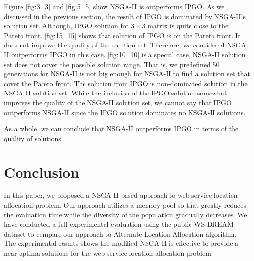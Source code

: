 \documentclass{llncs}
\begin{document}
Figure \ref{fig:3_3} and \ref{fig:5_5} show NSGA-II is outperforms IPGO. As we discussed in the previous section, the 
result of IPGO is dominated by NSGA-II's solution set. Although, IPGO solution for $3 \times 3$ matrix is quite close to the 
Pareto front. \ref{fig:15_15} shows that solution of IPGO is on the Pareto front. It does not improve the quality of the solution
set. Therefore, we considered NSGA-II outperforms IPGO in this case. \ref{fig:10_10} is a special case, NSGA-II solution set does
not cover the possible solution range. That is, we predefined 50 generations for NSGA-II is not big enough for NSGA-II to find a solution
set that cover the Pareto front. The solution from IPGO is non-dominated solution in the NSGA-II solution set. While the inclusion
of the IPGO solution somewhat improves the quality of the NSGA-II solution set, we cannot say that IPGO outperforms NSGA-II since the 
IPGO solution dominates no NSGA-II solutions.

As a whole, we can conclude that NSGA-II outperforms IPGO in terms of the quality of solutions.


\section{Conclusion}
In this paper, we proposed a NSGA-II based approach to web service location-allocation problem. Our approach utilizes a memory pool so that
greatly reduces the evaluation time while the diversity of the population gradually decreases. We have conducted a full experimental evaluation using the public WS-DREAM dataset to compare our approach to Alternate Location Allocation algorithm. 
The experimental results shows the modified NSGA-II is effective to provide a near-optima solutions for the web service location-allocation problem.




\end{document}
